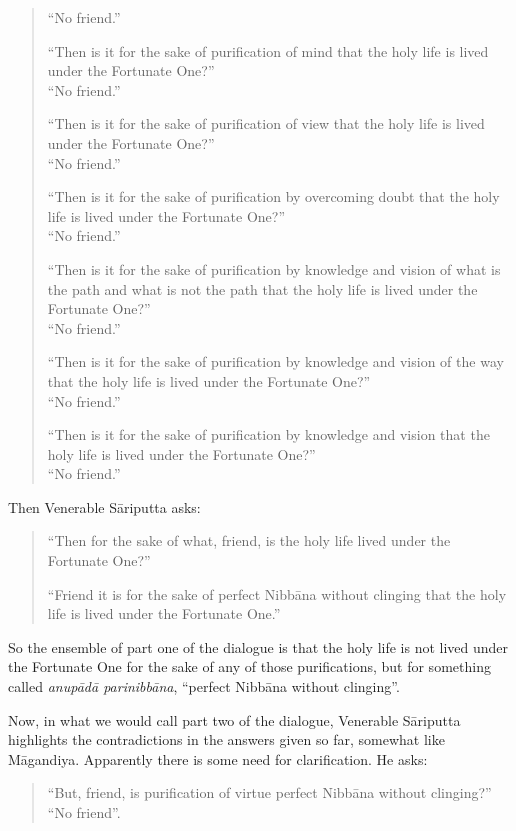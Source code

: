 \begin{quote}
``No friend.''

``Then is it for the sake of purification of mind that the holy life is lived under the Fortunate One?''\\
``No friend.''

``Then is it for the sake of purification of view that the holy life is lived under the Fortunate One?''\\
``No friend.''

``Then is it for the sake of purification by overcoming doubt that the holy life is lived under the Fortunate One?''\\
``No friend.''

``Then is it for the sake of purification by knowledge and vision of what is the path and what is not the path that the holy life is lived under the Fortunate One?''\\
``No friend.''

``Then is it for the sake of purification by knowledge and vision of the way that the holy life is lived under the Fortunate One?''\\
``No friend.''

``Then is it for the sake of purification by knowledge and vision that the holy life is lived under the Fortunate One?''\\
``No friend.''
\end{quote}

Then Venerable Sāriputta asks:

\begin{quote}
``Then for the sake of what, friend, is the holy life lived under the Fortunate One?''

``Friend it is for the sake of perfect Nibbāna without clinging that the holy life is lived under the Fortunate One.''
\end{quote}

So the ensemble of part one of the dialogue is that the holy life is not lived under the Fortunate One for the sake of any of those purifications, but for something called \emph{anupādā parinibbāna}, ``perfect Nibbāna without clinging''.

Now, in what we would call part two of the dialogue, Venerable Sāriputta highlights the contradictions in the answers given so far, somewhat like Māgandiya. Apparently there is some need for clarification. He asks:

\begin{quote}
``But, friend, is purification of virtue perfect Nibbāna without clinging?''\\
``No friend''.
\end{quote}

